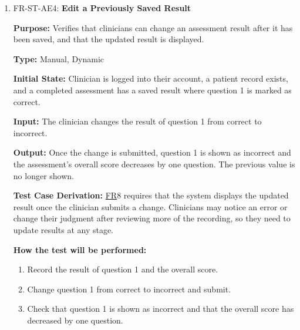 \documentclass[12pt, titlepage]{article}
\newcommand{\srsfr}[1]{\href{https://github.com/Nour-Fawaz/MacaBoca/blob/main/pdfs/SRS/SRS.pdf}{FR}}
\renewcommand{\_}{\oldunderscore\allowbreak}
\begin{document}
\begin{enumerate}
  \item FR-ST-AE4: \textbf{Edit a Previously Saved Result\\}
  \begin{mdframed}[linewidth=0.5mm]
      \textbf{Purpose:} Verifies that clinicians can change an assessment result after it has been saved, and that the updated result is displayed. \par
      \textbf{Type:} Manual, Dynamic \par
      \textbf{Initial State:} Clinician is logged into their account, a patient record exists, and a completed assessment has a saved result where question 1 is marked as correct. \par
      \textbf{Input:} The clinician changes the result of question 1 from correct to incorrect. \par
      \textbf{Output:} Once the change is submitted, question 1 is shown as incorrect and the assessment's overall score decreases by one question. The previous value is no longer shown. \par
      \textbf{Test Case Derivation:} \srsfr*{8} requires that the system displays the updated result once the clinician submits a change. Clinicians may notice an error or change their judgment after reviewing more of the recording, so they need to update results at any stage. \par
      \textbf{How the test will be performed:}
      \begin{enumerate}
        \item[1.] Record the result of question 1 and the overall score.
        \item[2.] Change question 1 from correct to incorrect and submit.
        \item[3.] Check that question 1 is shown as incorrect and that the overall score has decreased by one question.
      \end{enumerate}
  \end{mdframed}


\end{enumerate}
\end{document}
